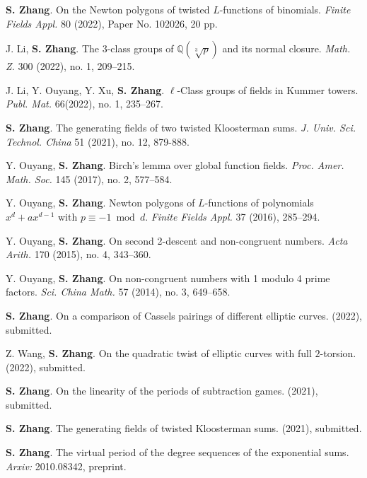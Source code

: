 \documentclass[11pt]{article}
\begin{document}
\newpage
{}
\begin{cvlist}
	\item \textbf{S. Zhang}.
	On the Newton polygons of twisted $L$-functions of binomials.
	{\em Finite Fields Appl.} 80 (2022), Paper No. 102026, 20 pp.

	\item J. Li, \textbf{S. Zhang}.
	The $3$-class groups of $\mathbb{Q}(\sqrt[3]{p})$ and its normal closure.
	{\em Math. Z.} 300 (2022), no. 1, 209--215.

	\item J. Li, Y. Ouyang, Y. Xu, \textbf{S. Zhang}.
	$\ell$-Class groups of fields in Kummer towers.
	{\em Publ. Mat.} 66(2022), no. 1, 235--267.

	\item \textbf{S. Zhang}.
	The generating fields of two twisted Kloosterman sums.
	{\em J. Univ. Sci. Technol. China} 51 (2021), no. 12, 879-888.

	\item Y. Ouyang, \textbf{S. Zhang}.
	Birch's lemma over global function fields.
	{\em Proc. Amer. Math. Soc.} 145 (2017), no. 2, 577--584.

	\item Y. Ouyang, \textbf{S. Zhang}.
	Newton polygons of $L$-functions of polynomials $x^d+ax^{d-1}$ with $p\equiv -1 \bmod d$.
	{\em Finite Fields Appl.} 37 (2016), 285--294.

	\item Y. Ouyang, \textbf{S. Zhang}.
	On second 2-descent and non-congruent numbers.
	{\em Acta Arith.} 170 (2015), no. 4, 343--360.

	\item Y. Ouyang, \textbf{S. Zhang}.
	On non-congruent numbers with 1 modulo 4 prime factors.
	{\em Sci. China Math.} 57 (2014), no. 3, 649--658.
\end{cvlist}


\begin{cvlist}
	\item \textbf{S. Zhang}.
	On a comparison of Cassels pairings of different elliptic curves.
	(2022), submitted.

	\item Z. Wang, \textbf{S. Zhang}.
	On the quadratic twist of elliptic curves with full $2$-torsion.
	(2022), submitted.

	\item \textbf{S. Zhang}.
	On the linearity of the periods of subtraction games.
	(2021), submitted.

	\item \textbf{S. Zhang}.
	The generating fields of twisted Kloosterman sums.
	(2021), submitted.

	\item \textbf{S. Zhang}.
	The virtual period of the degree sequences of the exponential sums.
	{\em Arxiv:} 2010.08342, preprint.
\end{cvlist}
\end{document}

